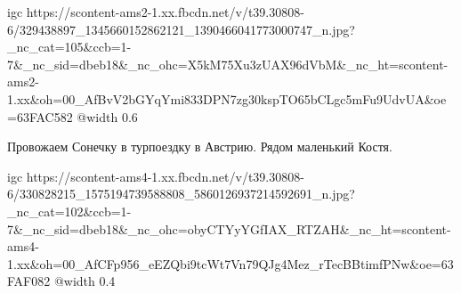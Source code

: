  
 
 
 
 

\clearpage
\qqSecCmt


\ifcmt
  igc https://scontent-ams2-1.xx.fbcdn.net/v/t39.30808-6/329438897_1345660152862121_1390466041773000747_n.jpg?_nc_cat=105&ccb=1-7&_nc_sid=dbeb18&_nc_ohc=X5kM75Xu3zUAX96dVbM&_nc_ht=scontent-ams2-1.xx&oh=00_AfBvV2bGYqYmi833DPN7zg30kspTO65bCLgc5mFu9UdvUA&oe=63FAC582
  @width 0.6
\fi

\begin{center}
\begin{minipage}{\textwidth}

Провожаем Сонечку в турпоездку в Австрию. Рядом маленький Костя.

\ifcmt
  igc https://scontent-ams4-1.xx.fbcdn.net/v/t39.30808-6/330828215_1575194739588808_5860126937214592691_n.jpg?_nc_cat=102&ccb=1-7&_nc_sid=dbeb18&_nc_ohc=obyCTYyYGfIAX_RTZAH&_nc_ht=scontent-ams4-1.xx&oh=00_AfCFp956_eEZQbi9tcWt7Vn79QJg4Mez_rTecBBtimfPNw&oe=63FAF082
  @width 0.4
\fi

\end{minipage}
\end{center}

